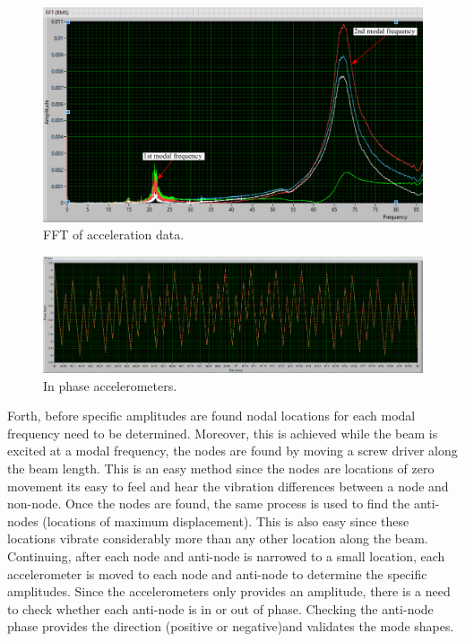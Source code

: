 \documentclass[12pt,letter]{article}
\numberwithin{ex}{section} %
\numberwithin{re}{section} %
\begin{document}
\begin{figure}[t]
	\centering 
	\includegraphics*[width= 1\linewidth]{figures/FFT/FFT.png}
	\vspace{0.1cm}
	\caption{FFT of acceleration data.}
	\label{fig:FFT}
\end{figure}



\begin{figure}[b]
	\centering 
	\includegraphics*[width= 1\linewidth]{figures/InPhase/InPhase.png}
	\vspace{0.1cm}
	\caption{In phase accelerometers.}
	\label{fig:InPhase}
\end{figure}



\newpage
Forth, before specific amplitudes are found nodal locations for each modal frequency need to be determined. Moreover, this is achieved while the beam is excited at a modal frequency, the nodes are found by moving a screw driver along the beam length. This is an easy method since the nodes are locations of zero movement its easy to feel and hear the vibration differences between a node and non-node. Once the nodes are found, the same process is used to find the anti-nodes (locations of maximum displacement). This is also easy since these locations vibrate considerably more than any other location along the beam. Continuing, after each node and anti-node is narrowed to a small location, each accelerometer is moved to each node and anti-node to determine the specific amplitudes. Since the accelerometers only provides an amplitude, there is a need to check whether each anti-node is in or out of phase. Checking the anti-node phase provides the direction (positive or negative)and validates the mode shapes. 
\end{document}

